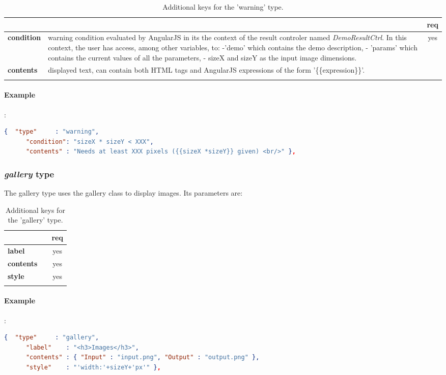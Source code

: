 \begin{longtable}{|>{\bf}L{\linewidth}|L{\linewidth}|c|}
\hline
      &  & {\bf req} 
\tabularnewline \hline \hline
 condition & warning condition evaluated by AngularJS in its 
the context of the result controler named {\em DemoResultCtrl}. In this 
context, the user has access, among other variables, to: -'demo' which 
contains the demo description, - 'params' which contains the current 
values of all the parameters, - sizeX and sizeY as the input image dimensions.  
& yes \\ \hline
 contents  & displayed text, can contain both HTML tags and AngularJS 
expressions of the form '\{\{expression\}\}'. & \\ \hline
\caption{Additional keys for the 'warning' type.}
\end{longtable}

\paragraph{Example}:\\

\begin{lstlisting}[language=json,firstnumber=1]
   {  "type"     : "warning", 
      "condition": "sizeX * sizeY < XXX",
      "contents" : "Needs at least XXX pixels ({{sizeX *sizeY}} given) <br/>" },
\end{lstlisting}

\subsubsection{ \emph{gallery} type}

The gallery type uses the gallery class to display images. Its parameters are:

\begin{longtable}{|>{\bf}L{\linewidth}|L{\linewidth}|c|}
\hline
      &  & {\bf req} 
\tabularnewline \hline \hline
 label      & & yes \\ \hline
 contents   & & yes \\ \hline
 style      & & yes \\ \hline
\caption{Additional keys for the 'gallery' type.}
\end{longtable}

\paragraph{Example}:\\
\begin{lstlisting}[language=json,firstnumber=1]
   {  "type"     : "gallery",
      "label"    : "<h3>Images</h3>",
      "contents" : { "Input" : "input.png", "Output" : "output.png" },
      "style"    : "'width:'+sizeY+'px'" },
\end{lstlisting}

